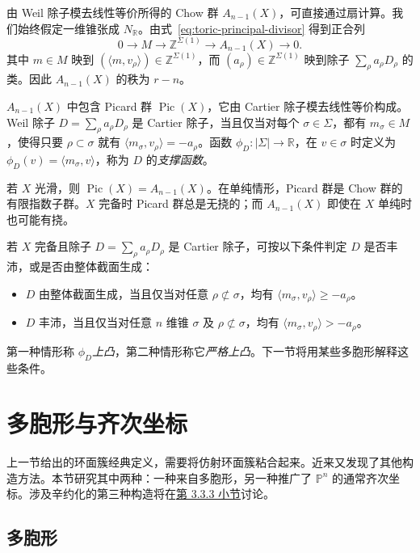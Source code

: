 由 Weil 除子模去线性等价所得的 Chow 群 $A_{n-1}(X)$，可直接通过扇计算。我们始终假定一维锥张成 $N_{\mathbb R}$。由式~\eqref{eq:toric-principal-divisor} 得到正合列
\begin{equation}\label{eq:toric-chow-sequence}
0\longrightarrow M\longrightarrow\mathbb Z^{\Sigma(1)}
\longrightarrow A_{n-1}(X)\longrightarrow0 .
\end{equation}
其中 $m\in M$ 映到 $(\langle m,v_\rho\rangle)\in\mathbb Z^{\Sigma(1)}$，而 $(a_\rho)\in\mathbb Z^{\Sigma(1)}$ 映到除子 $\sum_\rho a_\rho D_\rho$ 的类。因此 $A_{n-1}(X)$ 的秩为 $r-n$。

$A_{n-1}(X)$ 中包含 Picard 群 $\operatorname{Pic}(X)$，它由 Cartier 除子模去线性等价构成。Weil 除子 $D=\sum_\rho a_\rho D_\rho$ 是 Cartier 除子，当且仅当对每个 $\sigma\in\Sigma$，都有 $m_\sigma\in M$，使得只要 $\rho\subset\sigma$ 就有 $\langle m_\sigma,v_\rho\rangle=-a_\rho$。函数 $\phi_D:|\Sigma|\to\mathbb R$，在 $v\in\sigma$ 时定义为 $\phi_D(v)=\langle m_\sigma,v\rangle$，称为 $D$ 的\emph{支撑函数}。

若 $X$ 光滑，则 $\operatorname{Pic}(X)=A_{n-1}(X)$。在单纯情形，Picard 群是 Chow 群的有限指数子群。$X$ 完备时 Picard 群总是无挠的；而 $A_{n-1}(X)$ 即使在 $X$ 单纯时也可能有挠。

若 $X$ 完备且除子 $D=\sum_\rho a_\rho D_\rho$ 是 Cartier 除子，可按以下条件判定 $D$ 是否丰沛，或是否由整体截面生成：
\begin{itemize}
\item $D$ 由整体截面生成，当且仅当对任意 $\rho\not\subset\sigma$，均有 $\langle m_\sigma,v_\rho\rangle\geq-a_\rho$。
\item $D$ 丰沛，当且仅当对任意 $n$ 维锥 $\sigma$ 及 $\rho\not\subset\sigma$，均有 $\langle m_\sigma,v_\rho\rangle>-a_\rho$。
\end{itemize}
第一种情形称 $\phi_D$\emph{上凸}，第二种情形称它\emph{严格上凸}。下一节将用某些多胞形解释这些条件。

\section{多胞形与齐次坐标}\label{sec:polytopes-coordinates}

上一节给出的环面簇经典定义，需要将仿射环面簇粘合起来。近来又发现了其他构造方法。本节研究其中两种：一种来自多胞形，另一种推广了 $\mathbb P^n$ 的通常齐次坐标。涉及辛约化的第三种构造将在\hyperref[subsec:toric-symplectic]{第 3.3.3 小节}讨论。

\subsection{多胞形}\label{subsec:toric-polytopes}

